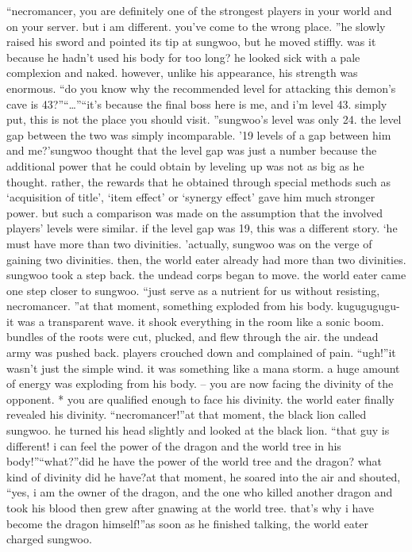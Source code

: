 “necromancer, you are definitely one of the strongest players in your world and on your server.
 but i am different.
 you’ve come to the wrong place.
”he slowly raised his sword and pointed its tip at sungwoo, but he moved stiffly.
was it because he hadn’t used his body for too long? he looked sick with a pale complexion and naked.
 however, unlike his appearance, his strength was enormous.
“do you know why the recommended level for attacking this demon’s cave is 43?”“…”“it’s because the final boss here is me, and i’m level 43.
 simply put, this is not the place you should visit.
”sungwoo’s level was only 24.
 the level gap between the two was simply incomparable.
’19 levels of a gap between him and me?’sungwoo thought that the level gap was just a number because the additional power that he could obtain by leveling up was not as big as he thought.
rather, the rewards that he obtained through special methods such as ‘acquisition of title’, ‘item effect’ or ‘synergy effect’ gave him much stronger power.
 but such a comparison was made on the assumption that the involved players’ levels were similar.
 if the level gap was 19, this was a different story.
‘he must have more than two divinities.
’actually, sungwoo was on the verge of gaining two divinities.
 then, the world eater already had more than two divinities.
sungwoo took a step back.
 the undead corps began to move.
the world eater came one step closer to sungwoo.
“just serve as a nutrient for us without resisting, necromancer.
”at that moment, something exploded from his body.
kugugugugu-
it was a transparent wave.
 it shook everything in the room like a sonic boom.
bundles of the roots were cut, plucked, and flew through the air.
 the undead army was pushed back.
 players crouched down and complained of pain.
“ugh!”it wasn’t just the simple wind.
 it was something like a mana storm.
 a huge amount of energy was exploding from his body.
– you are now facing the divinity of the opponent.
* you are qualified enough to face his divinity.
the world eater finally revealed his divinity.
“necromancer!”at that moment, the black lion called sungwoo.
 he turned his head slightly and looked at the black lion.
“that guy is different! i can feel the power of the dragon and the world tree in his body!”“what?”did he have the power of the world tree and the dragon? what kind of divinity did he have?at that moment, he soared into the air and shouted, “yes, i am the owner of the dragon, and the one who killed another dragon and took his blood then grew after gnawing at the world tree.
 that’s why i have become the dragon himself!”as soon as he finished talking, the world eater charged sungwoo.
